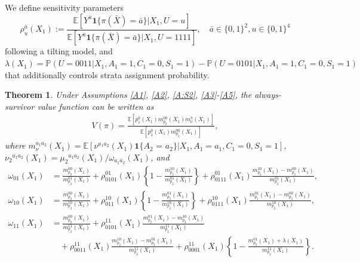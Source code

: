 \documentclass{article}
\newcommand{\E}{\mathbb{E}}
\newtheorem{theorem}{Theorem}
\begin{document}
We define sensitivity parameters
\[
\rho_{u}^{\bar a}(X_1) := \frac{\mathbb{E}[Y^{\bar a} \mathbf{1}\{\pi(\bar X)=\bar a\}|X_1,U=u]}{\mathbb{E}[Y^{\bar a}\mathbf{1}\{\pi(\bar X)=\bar a\}|X_1,U=1111]}, 
\quad \bar a\in \{0,1\}^2, u\in\{0,1\}^4
\]
following a tilting model, and $\lambda(X_1) = \mathbb{P}(U=0011|X_1,A_1=1,C_1=0,S_1=1) - \mathbb{P}(U=0101|X_1,A_1=1,C_1=0,S_1=1)$ that additionally controls strata assignment probability.

\begin{theorem}
Under Assumptions \ref{A1}, \ref{A2}, \ref{A:S2}, \ref{A3}-\ref{A5}, the always-survivor value function can be written as
\begin{align}
	V(\pi) = \frac{\E[ p_1^0(X_1)m_{p_2}^{00}(X_1) m_{\nu}^\pi(X_1) ]}{\E[ p_1^0(X_1)m_{p_2}^{00}(X_1) ]},  \label{Vsens}	
\end{align}
where $m_{\nu}^{a_1a_2}(X_1) = \E[\nu^{a_1a_2}(X_1) \mathbf{1}\{A_2\textrm{ = }a_2\} | X_1,A_1=a_1,C_1=0,S_1=1]$, ${\nu_2}^{a_1a_2}(X_1) = {\mu_2}^{a_1a_2}(X_1) / \omega_{a_1a_2}(X_1)$, and
\begin{align*}
	\omega_{01}(X_1) &= \frac{ m_{p_2}^{00}(X_1) }{ m_{p_2}^{01}(X_1) } + \rho_{0101}^{01}(X_1) \left\{ 1 - \frac{ m_{p_2}^{10}(X_1) }{ m_{p_2}^{01}(X_1) }\right\} + \rho_{0111}^{01}(X_1) \frac{m_{p_2}^{10}(X_1) - m_{p_2}^{00}(X_1)}{m_{p_2}^{01}(X_1)}, \\
	\omega_{10}(X_1) &= \frac{m_{p_2}^{00}(X_1)}{m_{p_2}^{10}(X_1)} + \rho_{011}^{10}(X_1) \left\{ 1 - \frac{m_{p_2}^{01}(X_1)}{m_{p_2}^{10}(X_1)}\right\} + \rho_{0111}^{10}(X_1) \frac{m_{p_2}^{01}(X_1) - m_{p_2}^{00}(X_1)}{m_{p_2}^{10}(X_1)}, \\
	\omega_{11}(X_1) &= \frac{m_{p_2}^{00}(X_1)}{m_{p_2}^{11}(X_1)} + \rho_{0101}^{11}(X_1) \frac{m_{p_2}^{01}(X_1) - m_{p_2}^{10}(X_1)}{m_{p_2}^{11}(X_1)} \\
	    &\quad+ \rho_{0011}^{11}(X_1) \frac{m_{p_2}^{10}(X_1) - m_{p_2}^{01}(X_1)}{m_{p_2}^{11}(X_1)} + \rho_{0001}^{11}(X_1) \left\{1 - \frac{m_{p_2}^{01}(X_1) + \lambda(X_1)}{m_{p_2}^{11}(X_1)} \right\}.
\end{align*}
\end{theorem}
%
\end{document}
